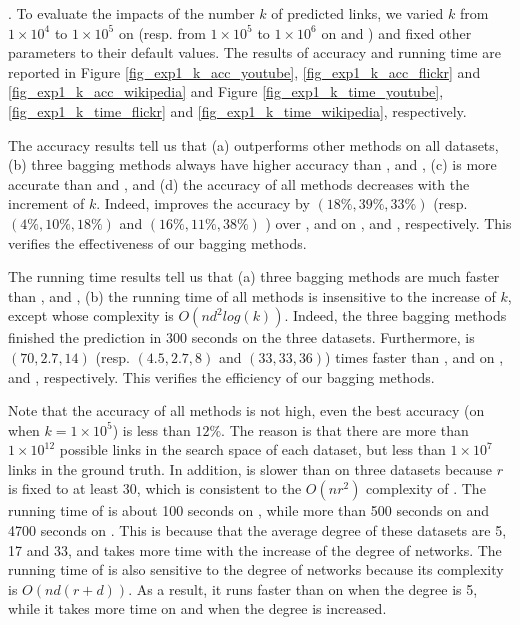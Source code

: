 


. To evaluate the impacts of the number $k$ of predicted links, we varied $k$
from $1\times 10^4$ to $1\times 10^5$ on \YouTube (resp. from $1\times 10^5$ to $1\times 10^6$ on
\Flickr and \Wikipedia) and fixed other parameters to their default values.
The results of accuracy and running time are reported in Figure \ref{fig_exp1_k_acc_youtube},
\ref{fig_exp1_k_acc_flickr} and \ref{fig_exp1_k_acc_wikipedia} and Figure \ref{fig_exp1_k_time_youtube},
\ref{fig_exp1_k_time_flickr} and \ref{fig_exp1_k_time_wikipedia}, respectively.




The accuracy results tell us that (a) \Biased
outperforms other methods on all datasets, (b) three bagging methods always have higher accuracy than \NMF, \Aa
and \BIGCLAM,  (c) \NMF is more accurate
than \Aa and \BIGCLAM, and (d) the accuracy of all methods decreases with the increment of $k$.
Indeed, \Biased improves the accuracy by $(18\%, 39\%, 33\%)$ (resp. $(4\%, 10\%, 18\%)$
and $(16\%, 11\%, 38\%)$ ) over \NMF, \Aa and \BIGCLAM on \YouTube, \Flickr and \Wikipedia,
respectively. This verifies the effectiveness of our bagging methods.


The running time results tell us that (a) three
bagging methods are much faster than \NMF, \Aa and \BIGCLAM, (b) the running time of
all methods is insensitive to the increase of $k$, except \Aa whose complexity is
$O(nd^2log(k))$. Indeed, the three bagging methods finished the prediction in 300 seconds on the
three datasets. Furthermore, \Biased is $(70, 2.7, 14)$ (resp. $(4.5, 2.7, 8)$ and $(33, 33, 36)$) times faster than \NMF, \Aa and
\BIGCLAM on \YouTube, \Flickr and \Wikipedia, respectively. This verifies the
efficiency of our bagging methods.


Note that the accuracy of all methods is not high, even the best
accuracy (\Biased on \Flickr when $k = 1\times 10^5$) is less than $12\%$. The reason is that
there are more than $1\times 10^{12}$ possible links in the search space of each dataset,
but less than $1\times 10^7$ links in the ground truth.
In addition, \NMF is slower than \Aa on three datasets because $r$ is fixed to at least $30$, which is consistent to the
$O(nr^2)$ complexity of \NMF. The running time
of \Aa is about 100 seconds on \YouTube,
while more than 500 seconds on \Flickr and 4700 seconds on \Wikipedia. This is because that the average degree of these datasets are 5, 17 and 33, and \Aa takes more time with the increase of the degree of networks.
The running time of \BIGCLAM is also sensitive to the degree of networks because its complexity is $O(nd(r + d))$.
As a result, it runs faster than
\NMF on \YouTube when the degree is 5, while it takes more time on \Flickr and \Wikipedia
when the degree is increased.






